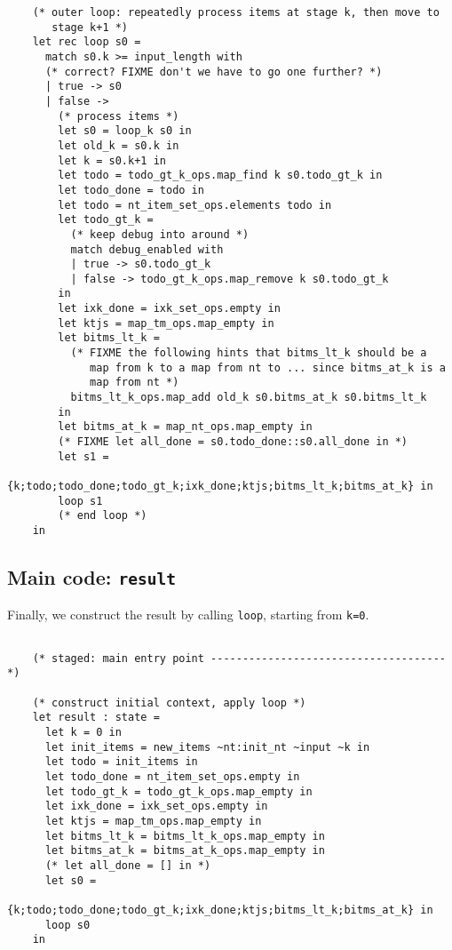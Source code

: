 \documentclass[]{article}
\begin{document}
\begin{multicols}{2}
\begin{verbatim}
    (* outer loop: repeatedly process items at stage k, then move to
       stage k+1 *)
    let rec loop s0 = 
      match s0.k >= input_length with  
      (* correct? FIXME don't we have to go one further? *)
      | true -> s0
      | false -> 
        (* process items *)
        let s0 = loop_k s0 in
        let old_k = s0.k in
        let k = s0.k+1 in
        let todo = todo_gt_k_ops.map_find k s0.todo_gt_k in
        let todo_done = todo in
        let todo = nt_item_set_ops.elements todo in
        let todo_gt_k = 
          (* keep debug into around *)
          match debug_enabled with 
          | true -> s0.todo_gt_k 
          | false -> todo_gt_k_ops.map_remove k s0.todo_gt_k
        in
        let ixk_done = ixk_set_ops.empty in
        let ktjs = map_tm_ops.map_empty in
        let bitms_lt_k = 
          (* FIXME the following hints that bitms_lt_k should be a
             map from k to a map from nt to ... since bitms_at_k is a
             map from nt *)
          bitms_lt_k_ops.map_add old_k s0.bitms_at_k s0.bitms_lt_k
        in
        let bitms_at_k = map_nt_ops.map_empty in
        (* FIXME let all_done = s0.todo_done::s0.all_done in *)
        let s1 = 
          {k;todo;todo_done;todo_gt_k;ixk_done;ktjs;bitms_lt_k;bitms_at_k} in
        loop s1  
        (* end loop *)
    in

\end{verbatim}

\subsection{Main code: \texttt{result}}

Finally, we construct the result by calling \texttt{loop}, starting from
\texttt{k=0}.

\begin{verbatim}

    (* staged: main entry point ------------------------------------- *)

    (* construct initial context, apply loop *)
    let result : state = 
      let k = 0 in
      let init_items = new_items ~nt:init_nt ~input ~k in
      let todo = init_items in  
      let todo_done = nt_item_set_ops.empty in
      let todo_gt_k = todo_gt_k_ops.map_empty in
      let ixk_done = ixk_set_ops.empty in
      let ktjs = map_tm_ops.map_empty in
      let bitms_lt_k = bitms_lt_k_ops.map_empty in
      let bitms_at_k = bitms_at_k_ops.map_empty in
      (* let all_done = [] in *)
      let s0 = 
        {k;todo;todo_done;todo_gt_k;ixk_done;ktjs;bitms_lt_k;bitms_at_k} in 
      loop s0
    in


\end{verbatim}
\end{multicols}
\end{document}
